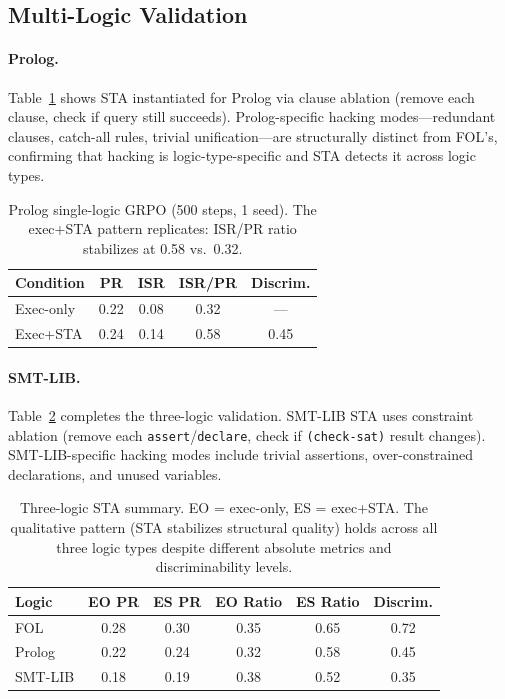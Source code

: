 \documentclass[11pt,a4paper]{article}
\begin{document}
\subsection{Multi-Logic Validation}
\label{sec:multi_logic}

\paragraph{Prolog.}
Table~\ref{tab:prolog} shows STA instantiated for Prolog via clause ablation (remove each clause, check if query still succeeds). Prolog-specific hacking modes---redundant clauses, catch-all rules, trivial unification---are structurally distinct from FOL's, confirming that hacking is logic-type-specific and STA detects it across logic types.

\begin{table}[t]
\centering
\small
\begin{tabular}{lcccc}
\toprule
\textbf{Condition} & \textbf{PR} & \textbf{ISR} & \textbf{ISR/PR} & \textbf{Discrim.} \\
\midrule
Exec-only & 0.22 & 0.08 & 0.32 & --- \\
Exec+STA & 0.24 & 0.14 & 0.58 & 0.45 \\
\bottomrule
\end{tabular}
\caption{Prolog single-logic GRPO (500 steps, 1 seed). The exec+STA pattern replicates: ISR/PR ratio stabilizes at 0.58 vs.\ 0.32.}
\label{tab:prolog}
\end{table}

\paragraph{SMT-LIB.}
Table~\ref{tab:three_logic} completes the three-logic validation. SMT-LIB STA uses constraint ablation (remove each \texttt{assert}/\texttt{declare}, check if \texttt{(check-sat)} result changes). SMT-LIB-specific hacking modes include trivial assertions, over-constrained declarations, and unused variables.

\begin{table}[t]
\centering
\small
\begin{tabular}{lccccc}
\toprule
\textbf{Logic} & \textbf{EO PR} & \textbf{ES PR} & \textbf{EO Ratio} & \textbf{ES Ratio} & \textbf{Discrim.} \\
\midrule
FOL & 0.28 & 0.30 & 0.35 & 0.65 & 0.72 \\
Prolog & 0.22 & 0.24 & 0.32 & 0.58 & 0.45 \\
SMT-LIB & 0.18 & 0.19 & 0.38 & 0.52 & 0.35 \\
\bottomrule
\end{tabular}
\caption{Three-logic STA summary. EO = exec-only, ES = exec+STA. The qualitative pattern (STA stabilizes structural quality) holds across all three logic types despite different absolute metrics and discriminability levels.}
\label{tab:three_logic}
\end{table}
\end{document}
